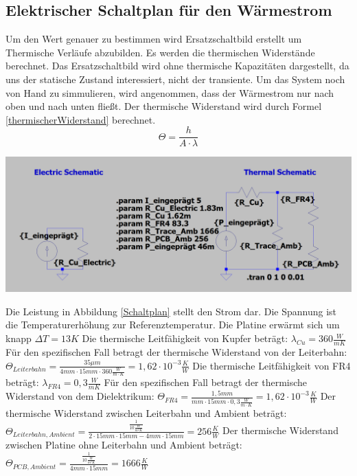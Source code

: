 \documentclass[10pt,a4paper,oneside,abstracton]{scrartcl}
\newenvironment{Figure}
  {\par\medskip\noindent\minipage{\linewidth}}
  {\endminipage\par\medskip}
\begin{document}
\begin{multicols}{2}
\section{Elektrischer Schaltplan für den Wärmestrom }
Um den Wert genauer zu bestimmen wird Ersatzschaltbild erstellt um Thermische Verläufe abzubilden.
Es werden die thermischen Widerstände berechnet. 
Das Ersatzschaltbild wird ohne thermische Kapazitäten dargestellt, da uns der statische Zustand interessiert, nicht der transiente.
Um das System noch von Hand zu simmulieren, wird angenommen, dass der Wärmestrom nur nach oben und nach unten fließt. 
Der thermische Widerstand wird durch Formel \ref*{thermischerWiderstand} berechnet. 
\begin{equation}
	\Theta =  \frac{h}{A \cdot \lambda}
	\label{thermischerWiderstand}
\end{equation}
\noindent
\begin{Figure}
	\includegraphics[width=\textwidth]{Bilder/Schaltplan.png}
	\label{Schaltplan}
\end{Figure}
\noindent
Die Leistung in Abbildung \ref{Schaltplan} stellt den Strom dar. Die Spannung ist die Temperaturerhöhung zur Referenztemperatur. 
Die Platine erwärmt sich um knapp $\Delta T = 13K$
Die thermische Leitfähigkeit von Kupfer beträgt:  \newline 
$\lambda_{Cu} = 360 \frac{W}{m K}$  \cite{Waermefluss} \newline
Für den spezifischen Fall betragt der thermische Widerstand von der Leiterbahn:  \newline
$\Theta_{Leiterbahn} = \frac{35 \mu m}{4mm \cdot 15mm \cdot 360 \frac{W}{m\cdot K}} = 1,62\cdot 10^{-3} \frac{K}{W}$
\newline 
Die thermische Leitfähigkeit von FR4 beträgt: 
\newline
 $\lambda_{FR4} = 0,3 \frac{W}{m K}$ \cite{Waermefluss} \newline
Für den spezifischen Fall betragt der thermische Widerstand von dem Dielektrikum: \newline
$\Theta_{FR4} = \frac{1,5 mm}{mm \cdot 15mm \cdot 0,3 \frac{W}{m\cdot K}} = 1,62\cdot 10^{-3} \frac{K}{W}$
Der thermische Widerstand zwischen Leiterbahn und Ambient beträgt: 
$\Theta_{Leiterbahn, Ambient} = \frac{\frac{1}{10 \frac{W}{m^2K}}}{ 2\cdot 15mm \cdot 15mm - 4mm \cdot 15mm} = 256 \frac{K}{W} $
Der thermische Widerstand zwischen Platine ohne Leiterbahn und Ambient beträgt: 
$\Theta_{PCB, Ambient} = \frac{\frac{1}{10 \frac{W}{m^2K}}}{  4mm \cdot 15mm} = 1666 \frac{K}{W} $


\end{multicols}
\end{document}
